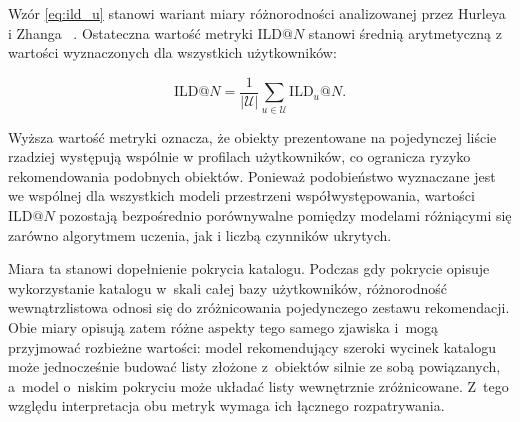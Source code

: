 Wzór \ref{eq:ild_u} stanowi wariant miary różnorodności analizowanej przez Hurleya i Zhanga ~\cite{hurley2011novelty}. Ostateczna wartość metryki $\text{ILD}@N$ stanowi średnią arytmetyczną z wartości wyznaczonych dla wszystkich użytkowników:

\begin{equation} 
    \text{ILD}@N = \frac{1}{|\mathcal{U}|} \sum_{u \in \mathcal{U}} \text{ILD}_u@N.
\end{equation}

Wyższa wartość metryki oznacza, że obiekty prezentowane na pojedynczej liście rzadziej występują wspólnie w profilach użytkowników, co ogranicza ryzyko rekomendowania podobnych obiektów. Ponieważ podobieństwo wyznaczane jest we wspólnej dla wszystkich modeli przestrzeni współwystępowania, wartości $\text{ILD}@N$ pozostają bezpośrednio porównywalne pomiędzy modelami różniącymi się zarówno algorytmem uczenia, jak i liczbą czynników ukrytych.

Miara ta stanowi dopełnienie pokrycia katalogu. Podczas gdy pokrycie opisuje
wykorzystanie katalogu w~skali całej bazy użytkowników, różnorodność
wewnątrzlistowa odnosi się do zróżnicowania pojedynczego zestawu rekomendacji.
Obie miary opisują zatem różne aspekty tego samego zjawiska i~mogą przyjmować
rozbieżne wartości: model rekomendujący szeroki wycinek katalogu może
jednocześnie budować listy złożone z~obiektów silnie ze sobą powiązanych,
a~model o~niskim pokryciu może układać listy wewnętrznie zróżnicowane.
Z~tego względu interpretacja obu metryk wymaga ich łącznego rozpatrywania.